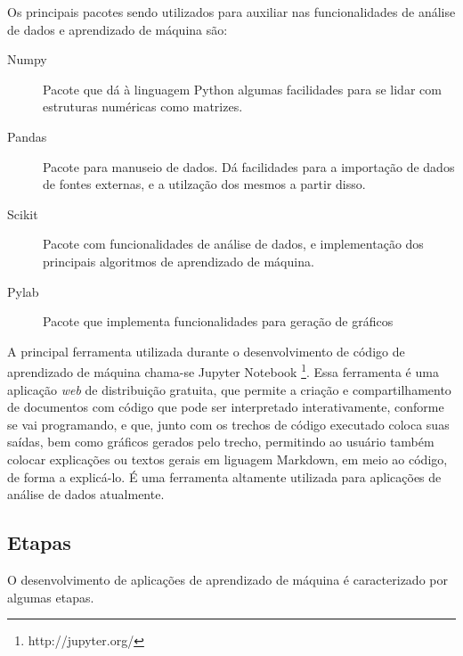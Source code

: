 			Os principais pacotes sendo utilizados para auxiliar nas funcionalidades de análise de dados e aprendizado de máquina são:

			\begin{description}
				\item [Numpy] Pacote que dá à linguagem Python algumas facilidades para se lidar com estruturas numéricas como matrizes.
				\item [Pandas] Pacote para manuseio de dados. Dá facilidades para a importação de dados de fontes externas, e a utilzação dos mesmos a partir disso.
				\item [Scikit] Pacote com funcionalidades de análise de dados, e implementação dos principais algoritmos de aprendizado de máquina.
				\item [Pylab] Pacote que implementa funcionalidades para geração de gráficos
			\end{description}

			A principal ferramenta utilizada durante o desenvolvimento de código de aprendizado de máquina chama-se Jupyter Notebook \footnote{http://jupyter.org/}. Essa ferramenta é uma aplicação \emph{web} de distribuição gratuita, que permite a criação e compartilhamento de documentos com código que pode ser interpretado interativamente, conforme se vai programando, e que, junto com os trechos de código executado coloca suas saídas, bem como gráficos gerados pelo trecho, permitindo ao usuário também colocar explicações ou textos gerais em liguagem Markdown, em meio ao código, de forma a explicá-lo. É uma ferramenta altamente utilizada para aplicações de análise de dados atualmente.

		\subsection{Etapas}


			O desenvolvimento de aplicações de aprendizado de máquina é caracterizado por algumas etapas. 

